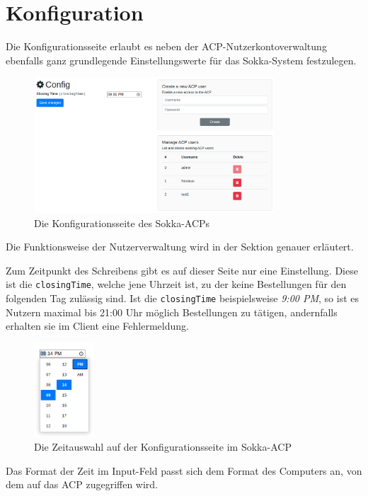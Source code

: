 \section{Konfiguration}

Die Konfigurationsseite erlaubt es neben der ACP-Nutzerkontoverwaltung ebenfalls ganz grundlegende Einstellungswerte für das Sokka-System festzulegen.

\begin{figure}[ht]
    \centering
    \includegraphics[width=0.8\textwidth]{images/ACP/config.png}
    \caption{Die Konfigurationsseite des Sokka-ACPs}
\end{figure}

Die Funktionsweise der Nutzerverwaltung wird in der Sektion \textit{} genauer erläutert.

Zum Zeitpunkt des Schreibens gibt es auf dieser Seite nur eine Einstellung. Diese ist die \lstinline{closingTime}, welche jene Uhrzeit ist, zu der keine Bestellungen für den folgenden Tag zulässig sind. Ist die \lstinline{closingTime} beispielsweise \textit{9:00 PM}, so ist es Nutzern maximal bis 21:00 Uhr möglich Bestellungen zu tätigen, andernfalls erhalten sie im Client eine Fehlermeldung.

\begin{figure}[ht]
    \centering
    \includegraphics[width=0.2\textwidth]{images/ACP/config_date.png}
    \caption{Die Zeitauswahl auf der Konfigurationsseite im Sokka-ACP}
\end{figure}

Das Format der Zeit im Input-Feld passt sich dem Format des Computers an, von dem auf das ACP zugegriffen wird.